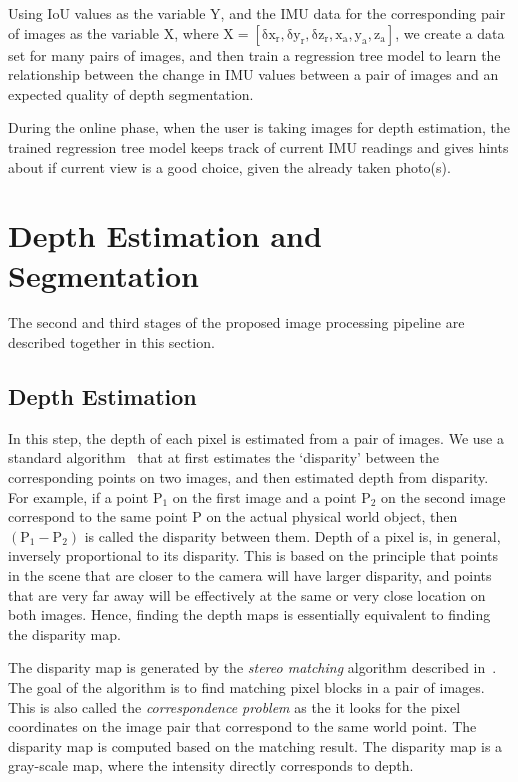 Using IoU values as the variable $\mathrm{Y}$, and the IMU data for the corresponding pair of images as the variable $\mathrm{X}$, where $\mathrm{X = [\delta x_r, \delta y_r, \delta z_r, x_a, y_a, z_a]}$, we create a data set for many pairs of images, and then train a regression tree model to learn the relationship between the change in IMU values between a pair of images and an expected quality of depth segmentation.

During the online phase, when the user is taking images for depth estimation, the trained regression tree model keeps track of current IMU readings and gives hints about if current view is a good choice, given the already taken photo(s).

\section{Depth Estimation and Segmentation}
\label{sec:dest}

The second and third stages of the proposed image processing pipeline are described together in this section.

\subsection{Depth Estimation}
\label{sec:algo_dep}

In this step, the depth of each pixel is estimated from a pair of images. We use a standard algorithm~\cite{hirschmuller2005accurate} that at first estimates the `disparity' between the corresponding points on two images, and then estimated depth from disparity. For example, if a point $\mathrm{P_1}$ on the first image and a point $\mathrm{P_2}$ on the second image correspond to the same point $\mathrm{P}$ on the actual physical world object, then $\mathrm{(P_1 - P_2)}$ is called the disparity between them. Depth of a pixel is, in general, inversely proportional to its disparity. This is based on the principle that points in the scene that are closer to the camera will have larger disparity, and points that are very far away will be effectively at the same or very close location on both images. Hence, finding the depth maps is essentially equivalent to finding the disparity map.

The disparity map is generated by the \textit{stereo matching} algorithm described in~\cite{hirschmuller2005accurate}. The goal of the algorithm is to find matching pixel blocks in a pair of images. This is also called the \textit{correspondence problem} as the it looks for the pixel coordinates on the image pair that correspond to the same world point. The disparity map is computed based on the matching result. The disparity map is a gray-scale map, where the intensity directly corresponds to depth.


